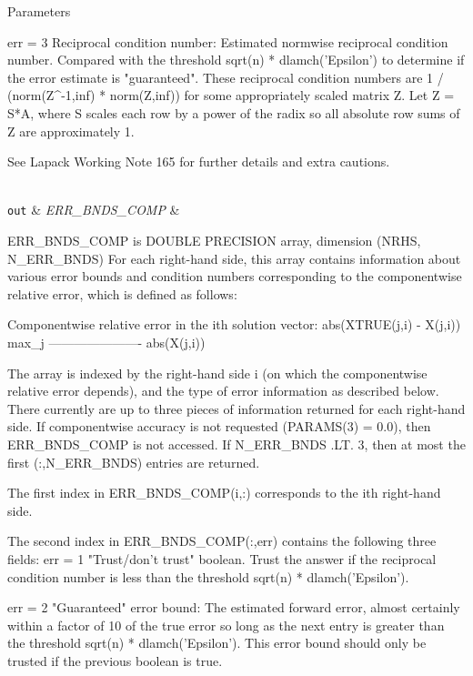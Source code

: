 \begin{DoxyParams}[1]{Parameters}
\begin{DoxyVerb}
     err = 3  Reciprocal condition number: Estimated normwise
              reciprocal condition number.  Compared with the threshold
              sqrt(n) * dlamch('Epsilon') to determine if the error
              estimate is "guaranteed". These reciprocal condition
              numbers are 1 / (norm(Z^{-1},inf) * norm(Z,inf)) for some
              appropriately scaled matrix Z.
              Let Z = S*A, where S scales each row by a power of the
              radix so all absolute row sums of Z are approximately 1.

     See Lapack Working Note 165 for further details and extra
     cautions.\end{DoxyVerb}
\\
\hline
\mbox{\tt out}  & {\em E\+R\+R\+\_\+\+B\+N\+D\+S\+\_\+\+C\+O\+M\+P} & \begin{DoxyVerb}          ERR_BNDS_COMP is DOUBLE PRECISION array, dimension (NRHS, N_ERR_BNDS)
     For each right-hand side, this array contains information about
     various error bounds and condition numbers corresponding to the
     componentwise relative error, which is defined as follows:

     Componentwise relative error in the ith solution vector:
                    abs(XTRUE(j,i) - X(j,i))
             max_j ----------------------
                         abs(X(j,i))

     The array is indexed by the right-hand side i (on which the
     componentwise relative error depends), and the type of error
     information as described below. There currently are up to three
     pieces of information returned for each right-hand side. If
     componentwise accuracy is not requested (PARAMS(3) = 0.0), then
     ERR_BNDS_COMP is not accessed.  If N_ERR_BNDS .LT. 3, then at most
     the first (:,N_ERR_BNDS) entries are returned.

     The first index in ERR_BNDS_COMP(i,:) corresponds to the ith
     right-hand side.

     The second index in ERR_BNDS_COMP(:,err) contains the following
     three fields:
     err = 1 "Trust/don't trust" boolean. Trust the answer if the
              reciprocal condition number is less than the threshold
              sqrt(n) * dlamch('Epsilon').

     err = 2 "Guaranteed" error bound: The estimated forward error,
              almost certainly within a factor of 10 of the true error
              so long as the next entry is greater than the threshold
              sqrt(n) * dlamch('Epsilon'). This error bound should only
              be trusted if the previous boolean is true.


\end{DoxyVerb}
\end{DoxyParams}

